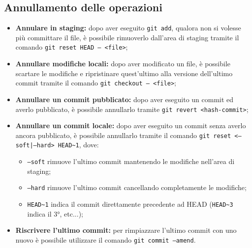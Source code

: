 \documentclass[12pt]{article}
\begin{document}
    \subsection{Annullamento delle operazioni}
    \begin{itemize}
      \item \textbf{Annulare in staging:} dopo aver eseguito \texttt{git add}, qualora non si volesse più committare il file, è possibile rimuoverlo dall'area di staging tramite il comando \texttt{git reset HEAD -- <file>};
      \item \textbf{Annullare modifiche locali:} dopo aver modificato un file, è possibile scartare le modifiche e ripristinare quest'ultimo alla versione dell'ultimo commit tramite il comando \texttt{git checkout -- <file>};
      \item \textbf{Annullare un commit pubblicato:} dopo aver eseguito un commit ed averlo pubblicato, è possibile annullarlo tramite \texttt{git revert <hash-commit>};
      \item \textbf{Annullare un commit locale:} dopo aver eseguito un commit senza averlo ancora pubblicato, è possibile annullarlo tramite il comando \texttt{git reset <--soft|--hard> HEAD\textasciitilde1}, dove:
        \begin{itemize}
          \item \texttt{--soft} rimuove l'ultimo commit mantenendo le modifiche nell'area di staging;
          \item \texttt{--hard} rimuove l'ultimo commit cancellando completamente le modifiche;
          \item \texttt{HEAD\textasciitilde1} indica il commit direttamente precedente ad HEAD (\texttt{HEAD\textasciitilde3} indica il 3°, etc...); 
        \end{itemize}
      \item \textbf{Riscrivere l'ultimo commit:} per rimpiazzare l'ultimo commit con uno nuovo è possibile utilizzare il comando \texttt{git commit --amend}.
    \end{itemize}
\end{document}
